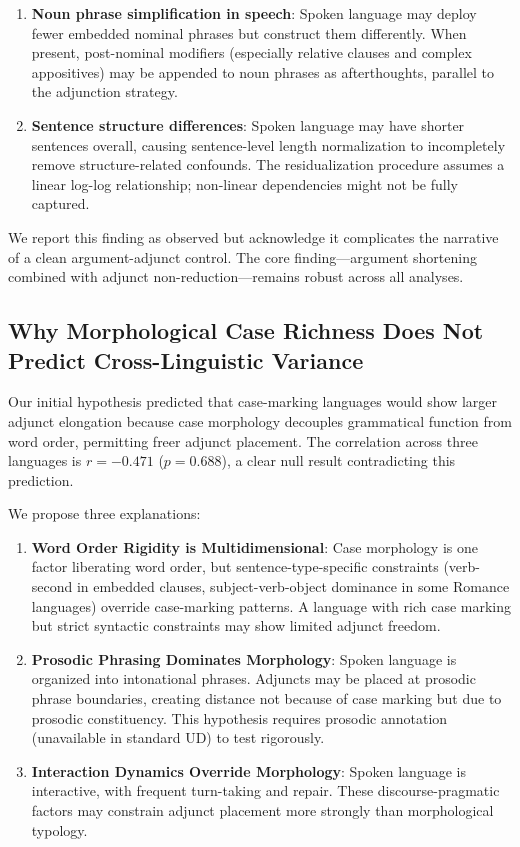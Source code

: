 \documentclass[11pt,letterpaper]{article}
\begin{document}
\begin{enumerate}
  \item \textbf{Noun phrase simplification in speech}: Spoken language may deploy fewer embedded nominal phrases but construct them differently. When present, post-nominal modifiers (especially relative clauses and complex appositives) may be appended to noun phrases as afterthoughts, parallel to the adjunction strategy.

  \item \textbf{Sentence structure differences}: Spoken language may have shorter sentences overall, causing sentence-level length normalization to incompletely remove structure-related confounds. The residualization procedure assumes a linear log-log relationship; non-linear dependencies might not be fully captured.
\end{enumerate}

We report this finding as observed but acknowledge it complicates the narrative of a clean argument-adjunct control. The core finding---argument shortening combined with adjunct non-reduction---remains robust across all analyses.

\subsection{Why Morphological Case Richness Does Not Predict Cross-Linguistic Variance}

Our initial hypothesis predicted that case-marking languages would show larger adjunct elongation because case morphology decouples grammatical function from word order, permitting freer adjunct placement. The correlation across three languages is $r = -0.471$ ($p = 0.688$), a clear null result contradicting this prediction.

We propose three explanations:

\begin{enumerate}
  \item \textbf{Word Order Rigidity is Multidimensional}: Case morphology is one factor liberating word order, but sentence-type-specific constraints (verb-second in embedded clauses, subject-verb-object dominance in some Romance languages) override case-marking patterns. A language with rich case marking but strict syntactic constraints may show limited adjunct freedom.

  \item \textbf{Prosodic Phrasing Dominates Morphology}: Spoken language is organized into intonational phrases. Adjuncts may be placed at prosodic phrase boundaries, creating distance not because of case marking but due to prosodic constituency. This hypothesis requires prosodic annotation (unavailable in standard UD) to test rigorously.

  \item \textbf{Interaction Dynamics Override Morphology}: Spoken language is interactive, with frequent turn-taking and repair. These discourse-pragmatic factors may constrain adjunct placement more strongly than morphological typology.
\end{enumerate}
\end{document}
